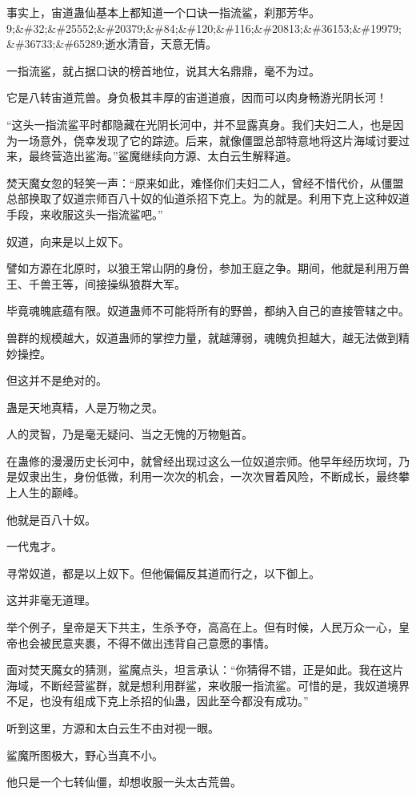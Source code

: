\begin{this_body}
事实上，宙道蛊仙基本上都知道一个口诀一指流鲨，刹那芳华。9;\&\#32;\&\#25552;\&\#20379;\&\#84;\&\#120;\&\#116;\&\#20813;\&\#36153;\&\#19979;\&\#36733;\&\#65289;逝水清音，天意无情。

一指流鲨，就占据口诀的榜首地位，说其大名鼎鼎，毫不为过。

它是八转宙道荒兽。身负极其丰厚的宙道道痕，因而可以肉身畅游光阴长河！

“这头一指流鲨平时都隐藏在光阴长河中，并不显露真身。我们夫妇二人，也是因为一场意外，侥幸发现了它的踪迹。后来，就像僵盟总部特意地将这片海域讨要过来，最终营造出鲨海。”鲨魔继续向方源、太白云生解释道。

焚天魔女忽的轻笑一声：“原来如此，难怪你们夫妇二人，曾经不惜代价，从僵盟总部换取了奴道宗师百八十奴的仙道杀招下克上。为的就是。利用下克上这种奴道手段，来收服这头一指流鲨吧。”

奴道，向来是以上奴下。

譬如方源在北原时，以狼王常山阴的身份，参加王庭之争。期间，他就是利用万兽王、千兽王等，间接操纵狼群大军。

毕竟魂魄底蕴有限。奴道蛊师不可能将所有的野兽，都纳入自己的直接管辖之中。

兽群的规模越大，奴道蛊师的掌控力量，就越薄弱，魂魄负担越大，越无法做到精妙操控。

但这并不是绝对的。

蛊是天地真精，人是万物之灵。

人的灵智，乃是毫无疑问、当之无愧的万物魁首。

在蛊修的漫漫历史长河中，就曾经出现过这么一位奴道宗师。他早年经历坎坷，乃是奴隶出生，身份低微，利用一次次的机会，一次次冒着风险，不断成长，最终攀上人生的巅峰。

他就是百八十奴。

一代鬼才。

寻常奴道，都是以上奴下。但他偏偏反其道而行之，以下御上。

这并非毫无道理。

举个例子，皇帝是天下共主，生杀予夺，高高在上。但有时候，人民万众一心，皇帝也会被民意夹裹，不得不做出违背自己意愿的事情。

面对焚天魔女的猜测，鲨魔点头，坦言承认：“你猜得不错，正是如此。我在这片海域，不断经营鲨群，就是想利用群鲨，来收服一指流鲨。可惜的是，我奴道境界不足，也没有组成下克上杀招的仙蛊，因此至今都没有成功。”

听到这里，方源和太白云生不由对视一眼。

鲨魔所图极大，野心当真不小。

他只是一个七转仙僵，却想收服一头太古荒兽。


\end{this_body}
